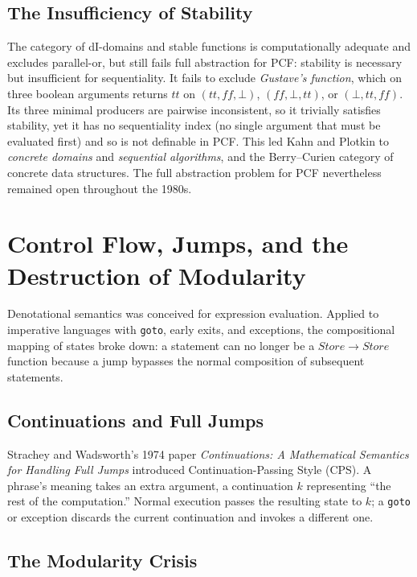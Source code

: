 \documentclass[11pt]{article}
\begin{document}
\subsection{The Insufficiency of Stability}

The category of dI-domains and stable functions is computationally adequate and excludes
parallel-or, but still fails full abstraction for PCF: stability is necessary but
insufficient for sequentiality. It fails to exclude \emph{Gustave's function}, which on
three boolean arguments returns $\mathit{tt}$ on $(\mathit{tt},\mathit{ff},\bot)$,
$(\mathit{ff},\bot,\mathit{tt})$, or $(\bot,\mathit{tt},\mathit{ff})$. Its three minimal
producers are pairwise inconsistent, so it trivially satisfies stability, yet it has no
sequentiality index (no single argument that must be evaluated first) and so is not
definable in PCF. This led Kahn and Plotkin to \emph{concrete domains} and
\emph{sequential algorithms}, and the Berry--Curien category of concrete data structures.
The full abstraction problem for PCF nevertheless remained open throughout the 1980s.

\section{Control Flow, Jumps, and the Destruction of Modularity}

Denotational semantics was conceived for expression evaluation. Applied to imperative
languages with \texttt{goto}, early exits, and exceptions, the compositional mapping of
states broke down: a statement can no longer be a $\mathit{Store}\to\mathit{Store}$
function because a jump bypasses the normal composition of subsequent statements.

\subsection{Continuations and Full Jumps}

Strachey and Wadsworth's 1974 paper \emph{Continuations: A Mathematical Semantics for
Handling Full Jumps} introduced Continuation-Passing Style (CPS). A phrase's meaning takes
an extra argument, a continuation $k$ representing ``the rest of the computation.'' Normal
execution passes the resulting state to $k$; a \texttt{goto} or exception discards the
current continuation and invokes a different one.

\subsection{The Modularity Crisis}
\end{document}
